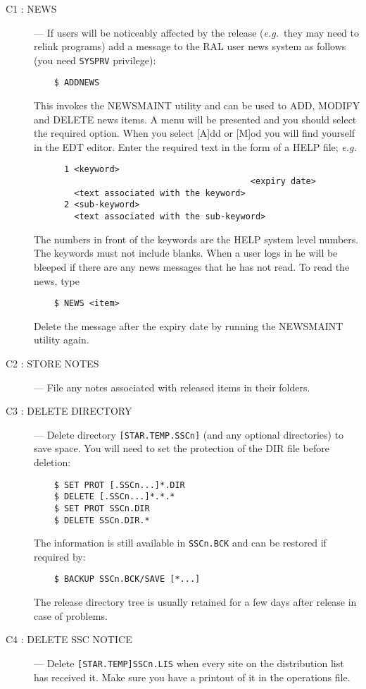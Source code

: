 \begin{description}

\item [C1 : NEWS] ---
If users will be noticeably affected by the release ({\em e.g.}\, they may
need to relink programs) add a message to the RAL user news system as follows
(you need {\tt SYSPRV} privilege):
\begin{verbatim}
    $ ADDNEWS
\end{verbatim}
This invokes the NEWSMAINT utility and can be used to ADD, MODIFY and DELETE
news items. A menu will be presented and you should select the required
option.
When you select [A]dd or [M]od you will find yourself in the EDT editor.
Enter the required text in the form of a HELP file; {\em e.g. }
\begin{verbatim}
      1 <keyword>
                                           <expiry date>
        <text associated with the keyword>
      2 <sub-keyword>
        <text associated with the sub-keyword>
\end{verbatim}
The numbers in front of the keywords are the HELP system level numbers.
The keywords must not include blanks.
When a user logs in he will be bleeped if there are any news messages that he
has not read.
To read the news, type
\begin{verbatim}
    $ NEWS <item>
\end{verbatim}
Delete the message after the expiry date by running the NEWSMAINT utility again.

\item [C2 : STORE NOTES] ---
File any notes associated with released items in their folders.

\item [C3 : DELETE DIRECTORY] ---
Delete directory {\tt [STAR.TEMP.SSCn]} (and any optional directories) to save
space.
You will need to set the protection of the DIR file before deletion:
\begin{verbatim}
    $ SET PROT [.SSCn...]*.DIR
    $ DELETE [.SSCn...]*.*.*
    $ SET PROT SSCn.DIR
    $ DELETE SSCn.DIR.*
\end{verbatim}
The information is still available in {\tt SSCn.BCK} and can be restored if
required by:
\begin{verbatim}
    $ BACKUP SSCn.BCK/SAVE [*...]
\end{verbatim}
The release directory tree is usually retained for a few days after release
in case of problems.

\item [C4 : DELETE SSC NOTICE] ---
Delete {\tt [STAR.TEMP]SSCn.LIS} when every site on the distribution list has
received it. Make sure you have a printout of it in the operations file.


\end{description}
